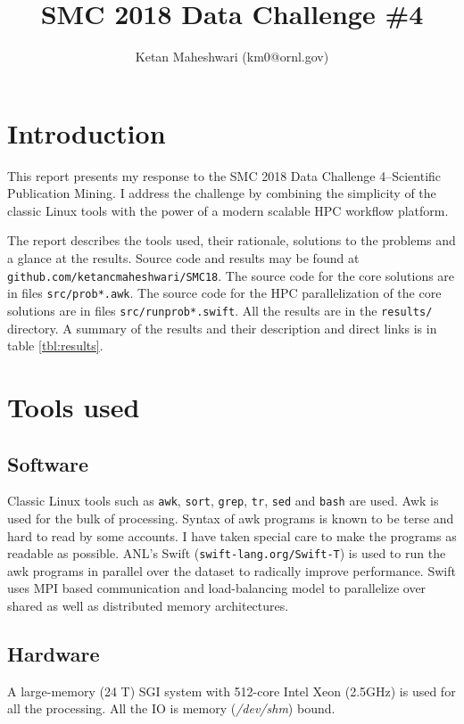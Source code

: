\documentclass{article}
\title{SMC 2018 Data Challenge \#4}
\author{Ketan Maheshwari (km0@ornl.gov)}
\begin{document}
\maketitle
\section*{Introduction}

This report presents my response to the SMC 2018 Data Challenge 4--Scientific
Publication Mining. I address the challenge by combining the simplicity of the
classic Linux tools with the power of a modern scalable HPC workflow
platform.

The report describes the tools used, their rationale, solutions to the problems
and a glance at the results. Source code and results may be found at
\texttt{github.com/ketancmaheshwari/SMC18}. The source code for the core
solutions are in files \texttt{src/prob*.awk}. The source code for the HPC
parallelization of the core solutions are in files \texttt{src/runprob*.swift}.
All the results are in the \texttt{results/} directory. A summary of the
results and their description and direct links is in table \ref{tbl:results}.

\section*{Tools used}
\subsection*{Software}
Classic Linux tools such as \texttt{awk}, \texttt{sort}, \texttt{grep},
\texttt{tr}, \texttt{sed} and \texttt{bash} are used. Awk is used for the bulk
of processing.  Syntax of awk programs is known to be terse and hard to read by
some accounts. I have taken special care to make the programs as readable as
possible. ANL's Swift (\texttt{swift-lang.org/Swift-T}) is used to run the awk
programs in parallel over the dataset to radically improve performance.  Swift
uses MPI based communication and load-balancing model to parallelize over
shared as well as distributed memory architectures.

\subsection*{Hardware}
A large-memory (24 T) SGI system with 512-core Intel Xeon (2.5GHz) is used for
all the processing. All the IO is memory (\textit{/dev/shm}) bound.
\end{document}
